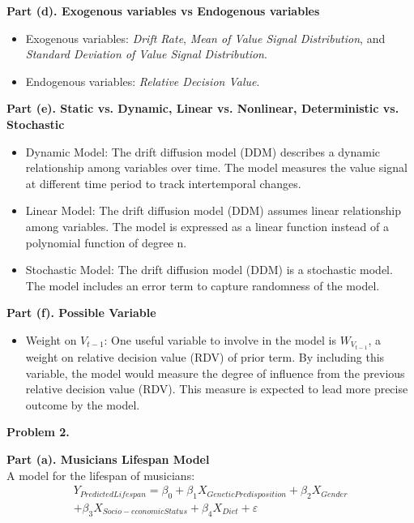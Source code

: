 \documentclass[letterpaper,12pt]{article}
\theoremstyle{definition}
\begin{document}
\noindent\textbf{Part (d). Exogenous variables vs Endogenous variables}
\begin{itemize}
\item Exogenous variables: \textit{Drift Rate}, \textit{Mean of Value Signal Distribution}, and \textit{Standard Deviation of Value Signal Distribution}.
\item Endogenous variables: \textit{Relative Decision Value}.
\end{itemize}

\noindent\textbf{Part (e). Static vs. Dynamic, Linear vs. Nonlinear, Deterministic vs. Stochastic}
\begin{itemize}
\item Dynamic Model: The drift diffusion model (DDM) describes a dynamic relationship among variables over time. The model measures the value signal at different time period to track intertemporal changes.
\item Linear Model: The drift diffusion model (DDM) assumes linear relationship among variables. The model is expressed as a linear function instead of a polynomial function of degree n.
\item Stochastic Model: The drift diffusion model (DDM) is a stochastic model. The model includes an error term to capture randomness of the model.
\end{itemize}

\noindent\textbf{Part (f). Possible Variable}
\begin{itemize}
\item
Weight on $V_{t-1}$: One useful variable to involve in the model is $W_{V_{t-1}}$, a weight on relative decision value (RDV) of prior term. By including this variable, the model would measure the degree of influence from the previous relative decision value (RDV). This measure is expected to lead more precise outcome by the model.\\
\end{itemize}

\clearpage

\normalsize
\noindent\textbf{Problem 2.}

\newline
\vspace{5mm}
\noindent\textbf{Part (a). Musicians Lifespan Model} \\
A model for the lifespan of musicians:
\begin{multline*}
Y_{Predicted Lifespan} = \beta_{0} + \beta_{1}X_{Genetic Predisposition} + \beta_{2}X_{Gender} \\ + \beta_{3}X_{Socio-economic Status} + \beta_{4}X_{Diet} + \varepsilon \\
\end{multline*}
\end{document}
